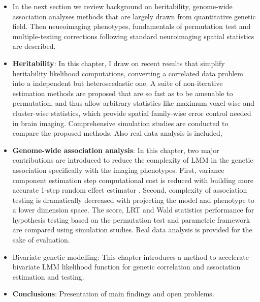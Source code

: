 \begin{itemize}
\item In the next section we review background on heritability, genome-wide association analyses methods that are largely drawn from quantitative genetic field. Then neueoimaging phenotypes, fundamentals of permutation test and multiple-testing corrections  following standard neuroimaging spatial statistics are described.

\item  \textbf{Heritability}: In this chapter, I draw on recent results that simplify heritability likelihood computations, converting a correlated data problem into a independent but heteroscedastic one.  A suite of non-iterative estimation methods are proposed that are so fast as to be amenable to permutation, and thus allow arbitrary statistics like maximum voxel-wise and cluster-wise statistics, which provide spatial family-wise error control needed in brain imaging. Comprehensive simulation studies are conducted to compare the proposed methods. Also real data analysis is included, 

\item \textbf{Genome-wide association analysis}: In this chapter,   two major contributions are introduced to reduce the complexity of LMM in the genetic association specifically with the imaging phenotypes.  First, variance component estimation step computational cost is reduced with building more accurate 1-step random effect estimator \citep{Ganjgahi2015}. Second, complexity of association testing is dramatically decreased with projecting the model and phenotype to a lower dimension space. The score, LRT and Wald statistics performance for hypothesis testing based on the permutation test and parametric framework are compared using simulation studies. Real data analysis is provided for the sake of evaluation.
\item {Bivariate genetic modelling}: This chapter introduces a method to accelerate bivariate LMM likelihood function for  genetic correlation and association estimation and testing. 
\item \textbf{Conclusions}: Presentation of main findings and open problems. 
\end{itemize}


